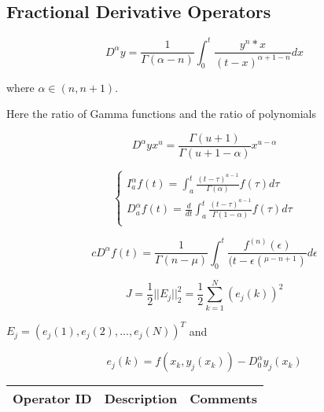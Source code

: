 \subsection{Fractional Derivative Operators}

\begin{equation}
D^{\alpha} y = \frac{1}{\Gamma (\alpha - n)} \int_{0}^{t} \frac{y^n * x}{(t - x)^{\alpha+1-n}} dx
\end{equation}

where $\alpha \in (n,n+1) $.  

Here the ratio of Gamma functions and the ratio of polynomials

\begin{equation}	
D^{\alpha} y x^{u} = \frac{\Gamma(u +1)}{\Gamma(u + 1 - \alpha)} x^{u-\alpha}
\end{equation}

\begin{equation}
\begin{cases}
I_{a}^{\alpha} f(t) = \int_{a}^{t} \frac{(t-\tau)^{a-1}}{\Gamma(\alpha)} f(\tau) d \tau \\
D_{a}^{\alpha} f(t) = \frac{d}{dt} \int_{a}^{t} \frac{(t-\tau)^{a-1}}{\Gamma(1-\alpha)} f(\tau) d \tau \\
\end{cases}
\end{equation}

\begin{equation}
cD^{\alpha} f(t) = \frac{1}{\Gamma(n - \mu)} \int_{0}^{t} \frac{f^{(n)} (\epsilon)}{(t-\epsilon(^{\mu - n + 1})} d\epsilon 
\end{equation}

\begin{equation}
J = \frac{1}{2} || E_{j} ||_{2}^{2} = \frac{1}{2} \sum_{k=1}^{N} (e_j (k))^2 
\end{equation}

$E_j =(e_{j}(1),e_{j}(2),...,e_{j}(N))^{T}$ and

\begin{equation}
e_{j}(k) = f(x_{k},y_{j}(x_{k})) - D_{0}^{\alpha} y_{j}(x_{k})
\end{equation}

\begin{table}[H]\centering
	\begin{tabular}{p{1cm}p{4cm}p{3cm}}
		Operator ID & Description & Comments\\
		\hline
		\hline
	\end{tabular}
\end{table}


